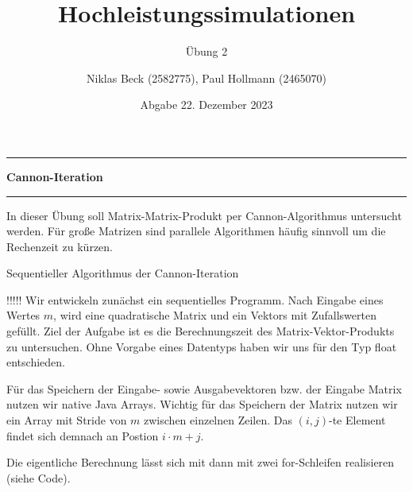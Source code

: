\documentclass[
ngerman,
subtask=ruled %
]{tudaexercise}
\begin{document}
	
	\title[Übung Hochleistungssimulationen]{Hochleistungssimulationen}
	\subtitle{\"Ubung 2}
	\author{Niklas Beck (2582775), Paul Hollmann (2465070)}
	\date{Abgabe 22. Dezember 2023}
	\maketitle
	
	\hrule
	{\Large \textbf{Cannon-Iteration}}
	\hrule
	
	In dieser Übung soll Matrix-Matrix-Produkt per Cannon-Algorithmus untersucht werden.
	Für große Matrizen sind parallele Algorithmen häufig sinnvoll um die Rechenzeit zu kürzen.
	
	\begin{task}{Sequentieller Algorithmus der Cannon-Iteration}\label{task:1}
	
		!!!!!
		Wir entwickeln zunächst ein sequentielles Programm.
		Nach Eingabe eines Wertes $m$, wird eine quadratische Matrix und ein Vektors mit Zufallswerten gefüllt.  Ziel der Aufgabe ist es die Berechnungszeit des Matrix-Vektor-Produkts zu untersuchen.
		Ohne Vorgabe eines Datentyps haben wir uns für den Typ float entschieden.

		
		Für das Speichern der Eingabe- sowie Ausgabevektoren bzw. der Eingabe Matrix nutzen wir native Java Arrays.
		Wichtig für das Speichern der Matrix nutzen wir ein Array mit Stride von $m$ zwischen einzelnen Zeilen.
		Das $(i,j)$-te Element findet sich demnach an Postion $i\cdot m + j$.
		
		Die eigentliche Berechnung lässt sich mit dann mit zwei for-Schleifen realisieren (siehe Code).
		
	\end{task}
	
\end{document}
